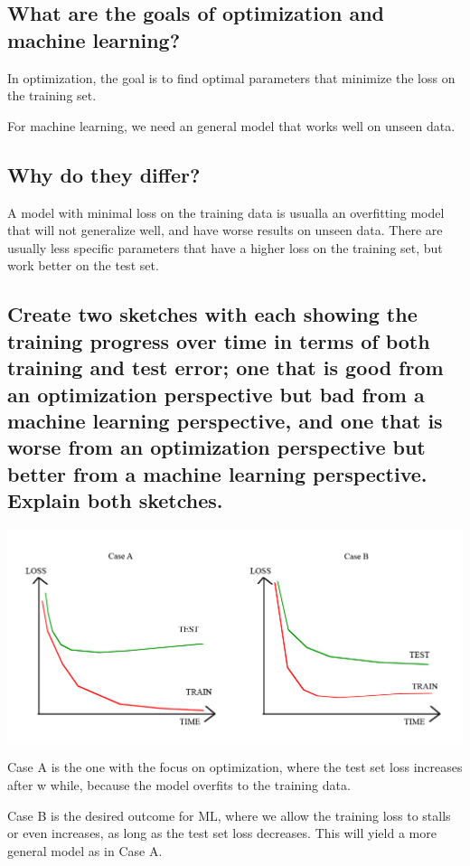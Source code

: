 \subsection{What are the goals of optimization and machine learning?}

In optimization, the goal is to find optimal parameters that minimize the loss on the training set.  

For machine learning, we need an general model that works well on unseen data. 

\subsection{Why do they differ?}
A model with minimal loss on the training data is usualla an overfitting model that will not generalize well, and have worse results on unseen data. There are usually less specific parameters that have a higher loss on the training set, but work better on the test set.

\subsection{Create two sketches with each showing the training progress over time in terms of both training and test error; one that is good from an optimization perspective but bad from a machine learning perspective, and one that is worse from an optimization perspective but better from a machine learning perspective. Explain both sketches.}

\includegraphics[width=\textwidth]{./img/optvsML.jpg}

Case A is the one with the focus on optimization, where the test set loss increases after w while, because the model overfits to the training data.

Case B is the desired outcome for ML, where we allow the training loss to stalls or even increases, as long as the test set loss decreases. This will yield a more general model as in Case A.

